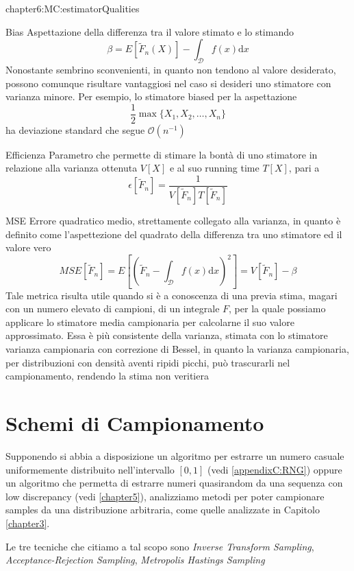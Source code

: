 \begin{altDescription}{chapter6:MC:estimatorQualities}
	\item[Bias] Aspettazione della differenza tra il valore stimato e lo stimando
		\begin{equation}
			\beta = E[\tilde{F}_n(X)]-\int_{\mathcal{D}}f(x)\mathrm{d}x
		\end{equation}
		Nonostante sembrino sconvenienti, in quanto non tendono al valore desiderato, possono comunque risultare vantaggiosi nel caso si desideri uno
		stimatore con varianza minore. Per esempio, lo stimatore biased per la aspettazione
		\begin{equation}
			\frac{1}{2}\max\{X_1,X_2,\ldots,X_n\}
		\end{equation}
		ha deviazione standard che segue \mbox{$\mathcal{O}\left(n^{-1}\right)$}
	\item[Efficienza] Parametro che permette di stimare la bont\`a di uno stimatore in relazione alla varianza ottenuta $V[X]$ e al suo running time
		$T[X]$, pari a 
		\begin{equation}\label{chapter6:MC:efficiency}
			\epsilon[\tilde{F}_n]=\frac{1}{V[\tilde{F}_n]T[\tilde{F}_n]}
		\end{equation}
	\item[MSE] Errore quadratico medio, strettamente collegato alla varianza, in quanto \`e definito come l'aspettezione del quadrato della 
		differenza tra uno stimatore ed il valore vero
		\begin{equation}
			MSE[\tilde{F}_n]=E\left[\left(\tilde{F}_n-\int_{\mathcal{D}}f(x)\mathrm{d}x\right)^2\right]=V[\tilde{F}_n]-\beta
		\end{equation}
		Tale metrica risulta utile quando si \`e a conoscenza di una previa stima, magari con un numero elevato di campioni, di un integrale $F$,
		per la quale possiamo applicare lo stimatore media campionaria per calcolarne il suo valore approssimato. Essa \`e pi\`u consistente della 
		varianza, stimata con lo stimatore varianza campionaria con correzione di Bessel, in quanto la varianza campionaria, per distribuzioni con 
		densit\`a aventi ripidi picchi, pu\`o trascurarli nel campionamento, rendendo la stima non veritiera
\end{altDescription}
\section{Schemi di Campionamento}
Supponendo si abbia a disposizione un algoritmo per estrarre un numero casuale uniformemente distribuito nell'intervallo $[0,1]$ 
(vedi \ref{appendixC:RNG}) oppure un algoritmo che permetta di estrarre numeri quasirandom da una sequenza con low discrepancy (vedi \ref{chapter5}),
analizziamo metodi per poter campionare samples da una distribuzione arbitraria, come quelle analizzate in Capitolo \ref{chapter3}.\par
Le tre tecniche che citiamo a tal scopo sono \textit{Inverse Transform Sampling}, \textit{Acceptance-Rejection Sampling}, 
\textit{Metropolis Hastings Sampling}
